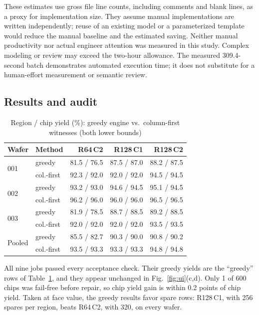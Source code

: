 \documentclass[conference]{IEEEtran}
\begin{document}
These estimates use gross file line counts, including comments and blank
lines, as a proxy for implementation size. They assume manual implementations
are written independently; reuse of an existing model or a parameterized
template would reduce the manual baseline and the estimated saving.
Neither manual productivity nor actual engineer attention was measured in
this study. Complex modeling or review may exceed the two-hour allowance.
The measured 309.4-second batch demonstrates automated execution time;
it does not substitute for a human-effort measurement or semantic review.

\subsection{Results and audit}

\begin{table}[t]
\centering
\caption{Region / chip yield (\%): greedy engine vs.\ column-first witnesses (both lower bounds)}
\label{tab:results}
\setlength{\tabcolsep}{3pt}
\begin{tabular}{llrrr}
\toprule
Wafer & Method & R64\,C2 & R128\,C1 & R128\,C2 \\
\midrule
\multirow{2}{*}{001} & greedy & 81.5 / 76.5 & 87.5 / 87.0 & 88.2 / 87.5 \\
 & col.-first & 92.3 / 92.0 & 92.0 / 92.0 & 94.5 / 94.5 \\
\multirow{2}{*}{002} & greedy & 93.2 / 93.0 & 94.6 / 94.5 & 95.1 / 94.5 \\
 & col.-first & 96.2 / 96.0 & 96.0 / 96.0 & 96.5 / 96.5 \\
\multirow{2}{*}{003} & greedy & 81.9 / 78.5 & 88.7 / 88.5 & 89.2 / 88.5 \\
 & col.-first & 92.0 / 92.0 & 92.0 / 92.0 & 93.5 / 93.5 \\
\midrule
\multirow{2}{*}{Pooled} & greedy & 85.5 / 82.7 & 90.3 / 90.0 & 90.8 / 90.2 \\
 & col.-first & 93.5 / 93.3 & 93.3 / 93.3 & 94.8 / 94.8 \\
\bottomrule
\end{tabular}
\end{table}

All nine jobs passed every acceptance check. Their greedy yields are the
``greedy'' rows of Table~\ref{tab:results}, and they appear unchanged in
Fig.~\ref{fig:ui}(c,d). Only 1 of 600 chips was fail-free before repair, so
chip yield gain is within 0.2 points of chip yield. Taken at face value, the
greedy results favor spare rows: R128\,C1, with 256 spares per region,
beats R64\,C2, with 320, on every wafer.
\end{document}
